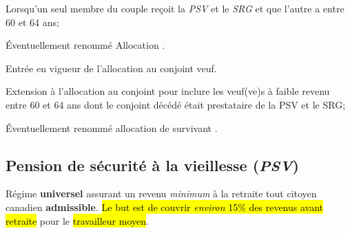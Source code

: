 \documentclass[10pt, french]{article}
\begin{document}
\begin{multicols*}{3}
\begin{rappel_enhanced}[Historique]
\begin{description}
		\begin{itemize}[leftmargin = *]
		\item	{\color{burntorange} Lorsqu'un seul membre du couple reçoit la \textit{PSV} et le \textit{SRG} et que l'autre a entre 60 et 64 ans;
		\item	Éventuellement renommé \og Allocation \fg{}.}
		\end{itemize}
	\item[1985]	Entrée en vigueur de l'allocation au conjoint veuf.
		\begin{itemize}[leftmargin = *]
		\item	{\color{burntorange} Extension à l'allocation au conjoint pour inclure les veuf(ve)s à faible revenu entre 60 et 64 ans dont le conjoint décédé était prestataire de la PSV et le SRG;
		\item	Éventuellement renommé \og allocation de survivant \fg{}.}
		\end{itemize}
\end{description}
\end{rappel_enhanced}

\subsection{Pension de sécurité à la vieillesse (\textit{PSV})}
\label{sec:PSV}
\begin{definitionNOHFILL}[Définition]
Régime \textbf{universel} assurant un revenu \textit{minimum} à la retraite tout citoyen canadien \textbf{admissible}. 
\hl{Le but est de couvrir \textit{environ} 15\% des revenus avant retraite} pour le \hl{travailleur moyen}.
\end{definitionNOHFILL}


\end{multicols*}
\end{document}
